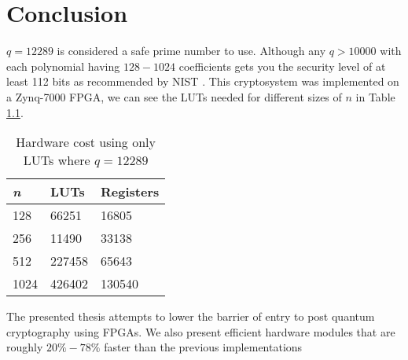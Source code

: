 \chapter{Conclusion\label{conclusion}}

$q = 12289$ is considered a safe prime number to use. Although any $q > 10 000$
with each polynomial having $128 - 1024$ coefficients gets you the security
level of at least 112 bits as recommended by NIST
\citep{FPGA_Post_Quantum_Primitives}. This cryptosystem was implemented on a
Zynq-7000 FPGA, we can see the LUTs needed for different sizes of $n$ in Table
\ref{tab:hardwarecost}.

\begin{table}[H]
    \centering
    \begin{tabular}{l|ll}
        \textit{n} & LUTs   & Registers \\ \hline
        128        & 66251  & 16805     \\
        256        & 11490  & 33138     \\
        512        & 227458 & 65643     \\
        1024       & 426402 & 130540
    \end{tabular}
    \caption{Hardware cost using only LUTs where $q = 12289$
    \citep{FPGA_Post_Quantum_Primitives}}
    \label{tab:hardwarecost}
\end{table}

The presented thesis attempts to lower the barrier of entry to post quantum
cryptography using FPGAs. We also present efficient hardware modules that are
roughly $20\% - 78\%$ faster than the previous implementations
\citep{FPGA_Post_Quantum_Primitives}
